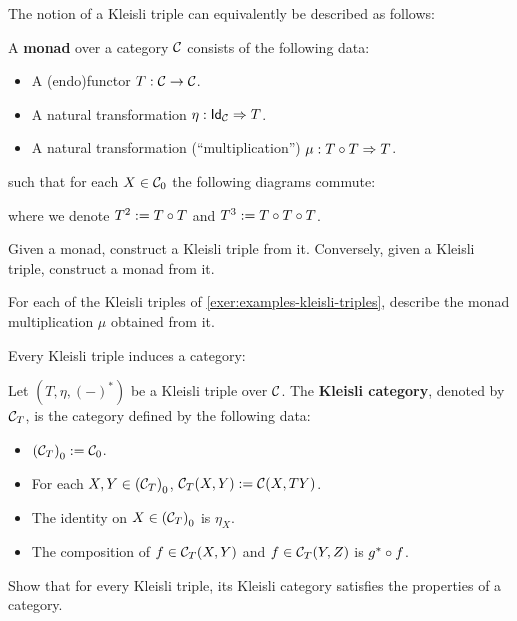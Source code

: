 The notion of a Kleisli triple can equivalently be described  as follows:
\begin{dfn}\label{def:monad}
A \textbf{monad} over a category $\CC$ consists of the following data:
\begin{itemize}
\item A (endo)functor $T:\CC\to\CC$.
\item A natural transformation $\NatTrans{\eta}{\Id[\CC]}{T}$.
\item A natural transformation (``multiplication'') $\NatTrans{\mu}{\co{T}{T}}{T}$.
\end{itemize}
such that for each $X\in\Ob{\CC}$ the following diagrams commute:
\begin{center}
\quad
{}

\end{center}
where we denote $T^2 := \co{T}{T}$ and $T^3 := \co{T}{\co{T}{T}}$.
\end{dfn}

\begin{exer} Given a monad, construct a Kleisli triple from it.
Conversely, given a Kleisli triple, construct a monad from it.
\end{exer}

\begin{exer}
  For each of the Kleisli triples of \cref{exer:examples-kleisli-triples}, describe the monad multiplication $\mu$ obtained from it.
\end{exer}

Every Kleisli triple induces a category:
\begin{dfn} Let $(T,\eta, (-)^{*})$ be a Kleisli triple over $\CC$. The \textbf{Kleisli category}, denoted by $\CC_{T}$, is the category defined by the following data:
\begin{itemize}
\item $\Ob{(\CC_T)} := \Ob{\CC}$.
\item For each $X,Y\in\Ob{(\CC_T)}$, $\CHom{\CC_T}{X}{Y} := \CHom{\CC}{X}{TY}$.
\item The identity on $X\in\Ob{(\CC_T)}$ is $\eta_X$.
\item The composition of $f\in \CHom{\CC_T}{X}{Y}$ and $f\in \CHom{\CC_T}{Y}{Z}$ is $\co{f}{g^{*}}$.
\end{itemize}
\end{dfn}

\begin{exer} Show that for every Kleisli triple, its Kleisli category satisfies the properties of a category.
\end{exer}


